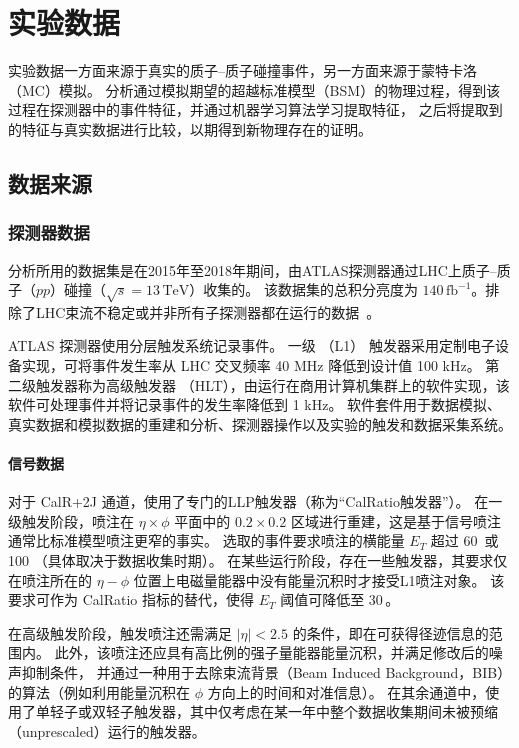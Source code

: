 
\chapter{实验数据}
实验数据一方面来源于真实的质子--质子碰撞事件，另一方面来源于蒙特卡洛（MC）模拟。
分析通过模拟期望的超越标准模型（BSM）的物理过程，得到该过程在探测器中的事件特征，并通过机器学习算法学习提取特征，
之后将提取到的特征与真实数据进行比较，以期得到新物理存在的证明。

\section{数据来源}

\subsection{探测器数据}
\label{sec:detector_data}

分析所用的数据集是在2015年至2018年期间，由ATLAS探测器通过LHC上质子--质子（$pp$）碰撞（$\sqrt{s} = 13\,\mathrm{TeV}$）收集的。
该数据集的总积分亮度为 $140\,\mathrm{fb}^{-1}$。排除了LHC束流不稳定或并非所有子探测器都在运行的数据~\cite{ATLAS_data_quality}。

ATLAS 探测器使用分层触发系统记录事件。
一级 （L1） 触发器采用定制电子设备实现，可将事件发生率从 LHC 交叉频率 40 MHz 降低到设计值 100 kHz。
第二级触发器称为高级触发器 （HLT），由运行在商用计算机集群上的软件实现，该软件可处理事件并将记录事件的发生率降低到 1 kHz。
软件套件用于数据模拟、真实数据和模拟数据的重建和分析、探测器操作以及实验的触发和数据采集系统。


\subsubsection{信号数据}
对于 CalR+2J 通道，使用了专门的LLP触发器（称为“CalRatio触发器”）。
在一级触发阶段，喷注在 $\eta \times \phi$ 平面中的 $0.2 \times 0.2$ 区域进行重建，这是基于信号喷注通常比标准模型喷注更窄的事实。
选取的事件要求喷注的横能量 $E_T$ 超过 60~\GeV 或 100 \GeV（具体取决于数据收集时期）。
在某些运行阶段，存在一些触发器，其要求仅在喷注所在的 $\eta - \phi$ 位置上电磁量能器中没有能量沉积时才接受L1喷注对象。
该要求可作为 CalRatio 指标的替代，使得 $E_T$ 阈值可降低至 30\,\GeV。

在高级触发阶段，触发喷注还需满足 $|\eta| < 2.5$ 的条件，即在可获得径迹信息的范围内。
此外，该喷注还应具有高比例的强子量能器能量沉积，并满足修改后的噪声抑制条件，
并通过一种用于去除束流背景（Beam Induced Background，BIB）的算法（例如利用能量沉积在 $\phi$ 方向上的时间和对准信息）。
在其余通道中，使用了单轻子或双轻子触发器，其中仅考虑在某一年中整个数据收集期间未被预缩（unprescaled）运行的触发器。


